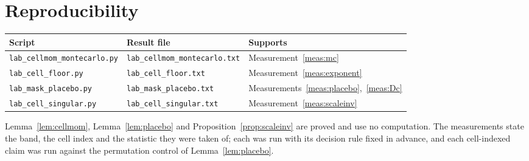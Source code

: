 \documentclass[11pt,a4paper]{article}
\theoremstyle{plain}
\theoremstyle{definition}
\theoremstyle{remark}
\begin{document}
\section{Reproducibility}

\begin{center}
\begin{tabular}{lll}
\hline
Script & Result file & Supports\\
\hline
\texttt{lab\_cellmom\_montecarlo.py} &
 \texttt{lab\_cellmom\_montecarlo.txt} & Measurement~\ref{meas:mc}\\
\texttt{lab\_cell\_floor.py} & \texttt{lab\_cell\_floor.txt}
 & Measurement~\ref{meas:exponent}\\
\texttt{lab\_mask\_placebo.py} & \texttt{lab\_mask\_placebo.txt}
 & Measurements~\ref{meas:placebo},~\ref{meas:Dc}\\
\texttt{lab\_cell\_singular.py} & \texttt{lab\_cell\_singular.txt}
 & Measurement~\ref{meas:scaleinv}\\
\hline
\end{tabular}
\end{center}

Lemma~\ref{lem:cellmom}, Lemma~\ref{lem:placebo} and
Proposition~\ref{prop:scaleinv} are proved and use no computation.
The measurements state the band, the cell index and the statistic they
were taken of; each was run with its decision rule fixed in advance,
and each cell-indexed claim was run against the permutation control of
Lemma~\ref{lem:placebo}.
\end{document}
